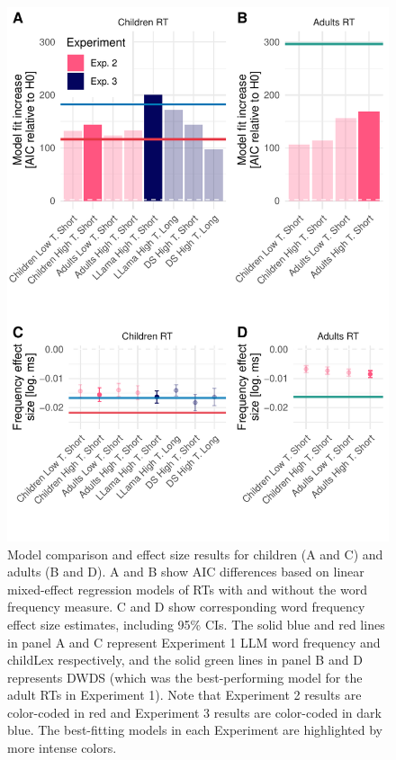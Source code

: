 \documentclass[manuscript]{stjour}
\begin{document}
\begin{figure}[!htbp]
  \centerline{
    \includegraphics[width=.8\textwidth]{figures/fig8_r2_age_sep.pdf}}
    \caption{Model comparison and effect size results for children (A and C) and adults (B and D). A and B show AIC differences based on linear mixed-effect regression models of RTs with and without the word frequency measure. C and D show corresponding word frequency effect size estimates, including 95\% CIs. The solid blue and red lines in panel A and C represent Experiment 1 LLM word frequency and childLex respectively, and the solid green lines in panel B and D represents DWDS (which was the best-performing model for the adult RTs in Experiment 1). Note that Experiment 2 results are color-coded in red and Experiment 3 results are color-coded in dark blue. The best-fitting models in each Experiment are highlighted by more intense colors.}
    \label{fig:modelcomprt2}
\end{figure}
\end{document}
